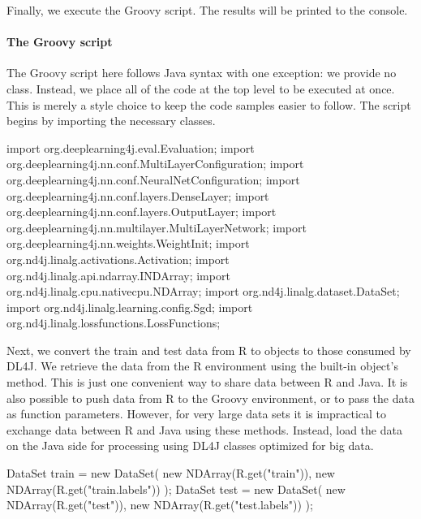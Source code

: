 Finally, we execute the Groovy script. The results will be printed to the console.


\paragraph{The Groovy script} The Groovy script here follows Java syntax with one exception: we provide no class. Instead, we place all of the code at the top level to be executed at once. This is merely a style choice to keep the code samples easier to follow. The script begins by importing the necessary classes.

\begin{example}
import org.deeplearning4j.eval.Evaluation;
import org.deeplearning4j.nn.conf.MultiLayerConfiguration;
import org.deeplearning4j.nn.conf.NeuralNetConfiguration;
import org.deeplearning4j.nn.conf.layers.DenseLayer;
import org.deeplearning4j.nn.conf.layers.OutputLayer;
import org.deeplearning4j.nn.multilayer.MultiLayerNetwork;
import org.deeplearning4j.nn.weights.WeightInit;
import org.nd4j.linalg.activations.Activation;
import org.nd4j.linalg.api.ndarray.INDArray;
import org.nd4j.linalg.cpu.nativecpu.NDArray;
import org.nd4j.linalg.dataset.DataSet;
import org.nd4j.linalg.learning.config.Sgd;
import org.nd4j.linalg.lossfunctions.LossFunctions;
\end{example}

Next, we convert the train and test data from R to objects to those consumed by DL4J. We retrieve the data from the R environment using the built-in  object's  method. This is just one convenient way to share data between R and Java. It is also possible to push data from R to the Groovy environment, or to pass the data as function parameters. However, for very large data sets it is impractical to exchange data between R and Java using these methods. Instead, load the data on the Java side for processing using DL4J classes optimized for big data.

\begin{example}
DataSet train = new DataSet(
    new NDArray(R.get("train")),
    new NDArray(R.get("train.labels"))
);
DataSet test = new DataSet(
    new NDArray(R.get("test")),
    new NDArray(R.get("test.labels"))
);
\end{example}

